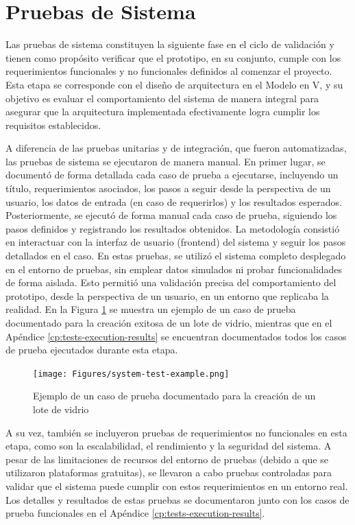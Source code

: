 \section{Pruebas de Sistema}
\label{sec:system-testing}

Las pruebas de sistema constituyen la siguiente fase en el ciclo de validación y tienen como propósito verificar que el prototipo, en su conjunto, cumple con los requerimientos funcionales y no funcionales definidos al comenzar el proyecto. Esta etapa se corresponde con el diseño de arquitectura en el Modelo en V, y su objetivo es evaluar el comportamiento del sistema de manera integral para asegurar que la arquitectura implementada efectivamente logra cumplir los requisitos establecidos.

A diferencia de las pruebas unitarias y de integración, que fueron automatizadas, las pruebas de sistema se ejecutaron de manera manual. En primer lugar, se documentó de forma detallada cada caso de prueba a ejecutarse, incluyendo un título, requerimientos asociados, los pasos a seguir desde la perspectiva de un usuario, los datos de entrada (en caso de requerirlos) y los resultados esperados. Posteriormente, se ejecutó de forma manual cada caso de prueba, siguiendo los pasos definidos y registrando los resultados obtenidos. La metodología consistió en interactuar con la interfaz de usuario (frontend) del sistema y seguir los pasos detallados en el caso. En estas pruebas, se utilizó el sistema completo desplegado en el entorno de pruebas, sin emplear datos simulados ni probar funcionalidades de forma aislada. Esto permitió una validación precisa del comportamiento del prototipo, desde la perspectiva de un usuario, en un entorno que replicaba la realidad. En la Figura \ref{fig:system-test-example} se muestra un ejemplo de un caso de prueba documentado para la creación exitosa de un lote de vidrio, mientras que en el Apéndice \ref{cp:tests-execution-results} se encuentran documentados todos los casos de prueba ejecutados durante esta etapa.

\begin{figure}[!htb]
	\centering
	\texttt{[image: Figures/system-test-example.png]}
	\caption{Ejemplo de un caso de prueba documentado para la creación de un lote de vidrio}
	\label{fig:system-test-example}
\end{figure}


A su vez, también se incluyeron pruebas de requerimientos no funcionales en esta etapa, como son la escalabilidad, el rendimiento y la seguridad del sistema. A pesar de las limitaciones de recursos del entorno de pruebas (debido a que se utilizaron plataformas gratuitas), se llevaron a cabo pruebas controladas para validar que el sistema puede cumplir con estos requerimientos en un entorno real. Los detalles y resultados de estas pruebas se documentaron junto con los casos de prueba funcionales en el Apéndice \ref{cp:tests-execution-results}.

